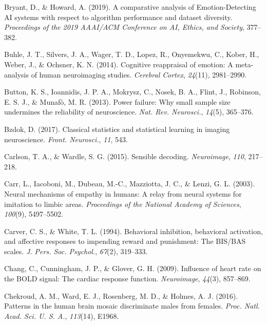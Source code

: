 \documentclass[11pt,american,a4paper,oneside,]{memoir} %
\begin{document}
\leavevmode\hypertarget{ref-Bryant2019-sg}{}%
Bryant, D., \& Howard, A. (2019). A comparative analysis of Emotion-Detecting AI systems with respect to algorithm performance and dataset diversity. \emph{Proceedings of the 2019 AAAI/ACM Conference on AI, Ethics, and Society}, 377--382.

\leavevmode\hypertarget{ref-buhle2014cognitive}{}%
Buhle, J. T., Silvers, J. A., Wager, T. D., Lopez, R., Onyemekwu, C., Kober, H., Weber, J., \& Ochsner, K. N. (2014). Cognitive reappraisal of emotion: A meta-analysis of human neuroimaging studies. \emph{Cerebral Cortex}, \emph{24}(11), 2981--2990.

\leavevmode\hypertarget{ref-Button2013-zu}{}%
Button, K. S., Ioannidis, J. P. A., Mokrysz, C., Nosek, B. A., Flint, J., Robinson, E. S. J., \& Munafò, M. R. (2013). Power failure: Why small sample size undermines the reliability of neuroscience. \emph{Nat. Rev. Neurosci.}, \emph{14}(5), 365--376.

\leavevmode\hypertarget{ref-Bzdok2017-li}{}%
Bzdok, D. (2017). Classical statistics and statistical learning in imaging neuroscience. \emph{Front. Neurosci.}, \emph{11}, 543.

\leavevmode\hypertarget{ref-Carlson2015-bz}{}%
Carlson, T. A., \& Wardle, S. G. (2015). Sensible decoding. \emph{Neuroimage}, \emph{110}, 217--218.

\leavevmode\hypertarget{ref-carr2003neural}{}%
Carr, L., Iacoboni, M., Dubeau, M.-C., Mazziotta, J. C., \& Lenzi, G. L. (2003). Neural mechanisms of empathy in humans: A relay from neural systems for imitation to limbic areas. \emph{Proceedings of the National Academy of Sciences}, \emph{100}(9), 5497--5502.

\leavevmode\hypertarget{ref-Carver1994-wp}{}%
Carver, C. S., \& White, T. L. (1994). Behavioral inhibition, behavioral activation, and affective responses to impending reward and punishment: The BIS/BAS scales. \emph{J. Pers. Soc. Psychol.}, \emph{67}(2), 319--333.

\leavevmode\hypertarget{ref-Chang2009-vu}{}%
Chang, C., Cunningham, J. P., \& Glover, G. H. (2009). Influence of heart rate on the BOLD signal: The cardiac response function. \emph{Neuroimage}, \emph{44}(3), 857--869.

\leavevmode\hypertarget{ref-Chekroud2016-tc}{}%
Chekroud, A. M., Ward, E. J., Rosenberg, M. D., \& Holmes, A. J. (2016). Patterns in the human brain mosaic discriminate males from females. \emph{Proc. Natl. Acad. Sci. U. S. A.}, \emph{113}(14), E1968.
\end{document}
